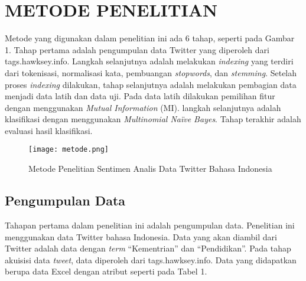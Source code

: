 \section*{METODE PENELITIAN}

Metode yang digunakan dalam penelitian ini ada 6 tahap,  seperti pada Gambar 1. Tahap pertama adalah pengumpulan data Twitter yang diperoleh dari tags.hawksey.info. Langkah selanjutnya adalah melakukan \textit{indexing} yang terdiri dari tokenisasi, normalisasi kata, pembuangan \textit{stopwords}, dan \textit{stemming}. Setelah proses \textit{indexing} dilakukan, tahap selanjutnya adalah melakukan pembagian data menjadi data latih dan data uji. Pada data latih dilakukan pemilihan fitur dengan menggunakan \textit{Mutual Information} (MI). langkah selanjutnya adalah klasifikasi dengan menggunakan \textit{Multinomial Naïve Bayes}. Tahap terakhir adalah evaluasi hasil klasifikasi. 

\begin{figure}[h!] %
\centering
\texttt{[image: metode.png]}
\caption{Metode Penelitian Sentimen Analis Data Twitter Bahasa Indonesia}
\label{fig:tahapan}
\end{figure}

\subsection*{Pengumpulan Data}

Tahapan pertama dalam  penelitian  ini adalah pengumpulan data. Penelitian ini menggunakan data Twitter bahasa Indonesia. Data yang akan diambil dari Twitter adalah data dengan \textit{term} “Kementrian” dan “Pendidikan”. Pada tahap akuisisi data \textit{tweet}, data diperoleh dari tags.hawksey.info. Data yang didapatkan berupa data Excel dengan atribut seperti pada Tabel 1.

